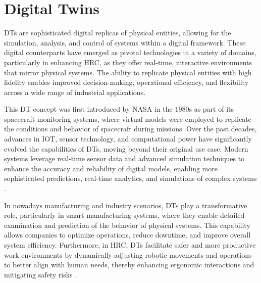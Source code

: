 



\section{Digital Twins}

\ac{DTs} are sophisticated digital replicas of physical entities, allowing for the simulation, analysis, and control of systems within a digital framework. These digital counterparts have emerged as pivotal technologies in a variety of domains, particularly in enhancing \ac{HRC}, as they offer real-time, interactive environments that mirror physical systems. The ability to replicate physical entities with high fidelity enables improved decision-making, operational efficiency, and flexibility across a wide range of industrial applications.

This \ac{DT} concept was first introduced by NASA in the 1980s as part of its spacecraft monitoring systems, where virtual models were employed to replicate the conditions and behavior of spacecraft during missions. Over the past decades, advances in \ac{IOT}, sensor technology, and computational power have significantly evolved the capabilities of \ac{DTs}, moving beyond their original use case. Modern systems leverage real-time sensor data and advanced simulation techniques to enhance the accuracy and reliability of digital models, enabling more sophisticated predictions, real-time analytics, and simulations of complex systems \cite{liu2022digitaltwin}.

In nowadays manufacturing and industry scenarios, \ac{DTs} play a transformative role, particularly in smart manufacturing systems, where they enable detailed examination and prediction of the behavior of physical systems. This capability allows companies to optimize operations, reduce downtime, and improve overall system efficiency. Furthermore, in \ac{HRC}, \ac{DTs} facilitate safer and more productive work environments by dynamically adjusting robotic movements and operations to better align with human needs, thereby enhancing ergonomic interactions and mitigating safety risks \cite{8477101}.

